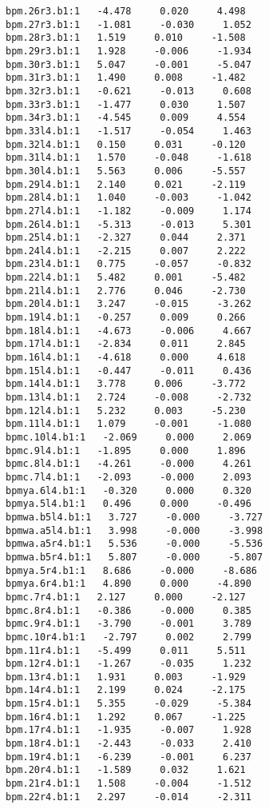 \begin{verbatim}
bpm.26r3.b1:1   -4.478     0.020     4.498
bpm.27r3.b1:1   -1.081     -0.030     1.052
bpm.28r3.b1:1   1.519     0.010     -1.508
bpm.29r3.b1:1   1.928     -0.006     -1.934
bpm.30r3.b1:1   5.047     -0.001     -5.047
bpm.31r3.b1:1   1.490     0.008     -1.482
bpm.32r3.b1:1   -0.621     -0.013     0.608
bpm.33r3.b1:1   -1.477     0.030     1.507
bpm.34r3.b1:1   -4.545     0.009     4.554
bpm.33l4.b1:1   -1.517     -0.054     1.463
bpm.32l4.b1:1   0.150     0.031     -0.120
bpm.31l4.b1:1   1.570     -0.048     -1.618
bpm.30l4.b1:1   5.563     0.006     -5.557
bpm.29l4.b1:1   2.140     0.021     -2.119
bpm.28l4.b1:1   1.040     -0.003     -1.042
bpm.27l4.b1:1   -1.182     -0.009     1.174
bpm.26l4.b1:1   -5.313     -0.013     5.301
bpm.25l4.b1:1   -2.327     0.044     2.371
bpm.24l4.b1:1   -2.215     0.007     2.222
bpm.23l4.b1:1   0.775     -0.057     -0.832
bpm.22l4.b1:1   5.482     0.001     -5.482
bpm.21l4.b1:1   2.776     0.046     -2.730
bpm.20l4.b1:1   3.247     -0.015     -3.262
bpm.19l4.b1:1   -0.257     0.009     0.266
bpm.18l4.b1:1   -4.673     -0.006     4.667
bpm.17l4.b1:1   -2.834     0.011     2.845
bpm.16l4.b1:1   -4.618     0.000     4.618
bpm.15l4.b1:1   -0.447     -0.011     0.436
bpm.14l4.b1:1   3.778     0.006     -3.772
bpm.13l4.b1:1   2.724     -0.008     -2.732
bpm.12l4.b1:1   5.232     0.003     -5.230
bpm.11l4.b1:1   1.079     -0.001     -1.080
bpmc.10l4.b1:1   -2.069     0.000     2.069
bpmc.9l4.b1:1   -1.895     0.000     1.896
bpmc.8l4.b1:1   -4.261     -0.000     4.261
bpmc.7l4.b1:1   -2.093     -0.000     2.093
bpmya.6l4.b1:1   -0.320     0.000     0.320
bpmya.5l4.b1:1   0.496     0.000     -0.496
bpmwa.b5l4.b1:1   3.727     -0.000     -3.727
bpmwa.a5l4.b1:1   3.998     -0.000     -3.998
bpmwa.a5r4.b1:1   5.536     -0.000     -5.536
bpmwa.b5r4.b1:1   5.807     -0.000     -5.807
bpmya.5r4.b1:1   8.686     -0.000     -8.686
bpmya.6r4.b1:1   4.890     0.000     -4.890
bpmc.7r4.b1:1   2.127     0.000     -2.127
bpmc.8r4.b1:1   -0.386     -0.000     0.385
bpmc.9r4.b1:1   -3.790     -0.001     3.789
bpmc.10r4.b1:1   -2.797     0.002     2.799
bpm.11r4.b1:1   -5.499     0.011     5.511
bpm.12r4.b1:1   -1.267     -0.035     1.232
bpm.13r4.b1:1   1.931     0.003     -1.929
bpm.14r4.b1:1   2.199     0.024     -2.175
bpm.15r4.b1:1   5.355     -0.029     -5.384
bpm.16r4.b1:1   1.292     0.067     -1.225
bpm.17r4.b1:1   -1.935     -0.007     1.928
bpm.18r4.b1:1   -2.443     -0.033     2.410
bpm.19r4.b1:1   -6.239     -0.001     6.237
bpm.20r4.b1:1   -1.589     0.032     1.621
bpm.21r4.b1:1   1.508     -0.004     -1.512
bpm.22r4.b1:1   2.297     -0.014     -2.311

\end{verbatim}
